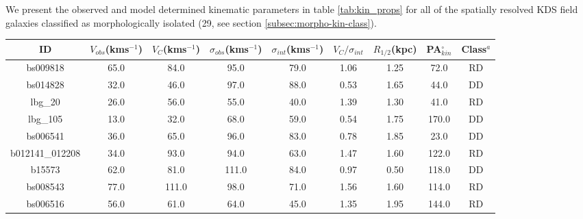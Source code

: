 \documentclass[fleqn,usenatbib]{mn2e}
\begin{document}
We present the observed and model determined kinematic parameters in table \ref{tab:kin_props} for all of the spatially resolved KDS field galaxies classified as morphologically isolated (29, see section \cref{subsec:morpho-kin-class}).


\begin{table*}
\centering
\begin{threeparttable}
\caption{Dynamical Properties for the resolved and morphologically isolated KDS field galaxies}
\label{tab:kin_props}
\begin{tabular}{ccccccccc}

 \hline
ID & $V_{obs}$(kms$^{-1}$) & $V_{C}$(kms$^{-1}$) & $\sigma_{obs}$(kms$^{-1}$) & $\sigma_{int}$(kms$^{-1}$) & $V_{C}/\sigma_{int}$ & $R_{1/2}$(kpc) & PA$_{kin}^{\circ}$ & Class$^{a}$ \\
 \hline
bs009818        & 65.0                    & 84.0                     & 95.0                  & 79.0                   & 1.06       & 1.25        & 72.0 & RD \\
bs014828        & 32.0                    & 46.0                     & 97.0                  & 88.0                   & 0.53       & 1.65      & 44.0 & DD    \\
lbg\_20         & 26.0                    & 56.0                     & 55.0                  & 40.0                   & 1.39      & 1.30        & 41.0 & RD  \\
lbg\_105        & 13.0                    & 32.0                     & 68.0                  & 59.0                   & 0.54       & 1.75       & 170.0 & DD \\
bs006541        & 36.0                    & 65.0                     & 96.0                  & 83.0                   & 0.78        & 1.85       & 23.0 & DD \\
b012141\_012208 & 34.0                    & 93.0                     & 94.0                  & 63.0                   & 1.47       & 1.60       & 122.0 & RD \\
b15573          & 62.0                    & 81.0                     & 111.0                 & 84.0                   & 0.97        & 0.50       & 118.0 & DD \\
bs008543        & 77.0                    & 111.0                    & 98.0                  & 71.0                   & 1.56       & 1.60       & 114.0 & RD \\
bs006516        & 56.0                    & 61.0                     & 64.0                  & 45.0                   & 1.35      & 1.95       & 144.0 & RD  \\

\end{tabular}
\end{threeparttable}
\end{table*}
\end{document}
